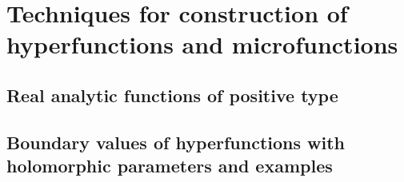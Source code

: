 \section{Techniques for construction of hyperfunctions and microfunctions}

\subsection{Real analytic functions of positive type}

\subsection{Boundary values of hyperfunctions with holomorphic parameters and examples}